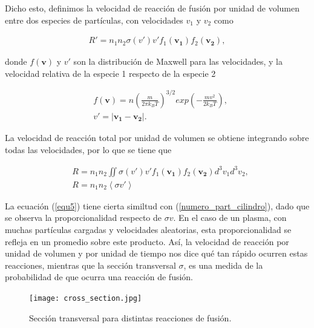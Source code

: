 \documentclass[../main.tex]{subfiles}
\begin{document}
	Dicho esto, definimos la velocidad de reacción de fusión por unidad de volumen entre dos especies de partículas, con velocidades $v_1$ y $v_2$ como
	
	\begin{align}
	    R' = n_1n_2\sigma(v')v'f_1(\mathbf{v_1})f_2(\mathbf{v_2}),  
	\end{align}
	
	donde $f(\mathbf{v})$ y $v'$ son la distribución de Maxwell para las velocidades, y la velocidad relativa de la especie 1 respecto de la especie 2
	
	\begin{align}
	    &f\left(\mathbf{v}\right) = n\left(\frac{m}{2\pi k_BT}\right)^{3/2}exp\left(-\frac{mv^2}{2k_BT}\right), \\
	    &v'= \left|\mathbf{v_1} - \mathbf{v_2} \right|.
	\end{align}
	
	La velocidad de reacción total por unidad de volumen se obtiene integrando sobre todas las velocidades, por lo que se tiene que
	
	\begin{align}
	    &R = n_1n_2\iint\sigma(v')v'f_1(\mathbf{v_1})f_2(\mathbf{v_2})d^3v_1d^3v_2, \label{equ4} \\
	    &R = n_1n_2\left<\sigma v' \right> \label{equ5}
	\end{align}
	
	La ecuación (\ref{equ5}) tiene cierta similtud con (\ref{numero_part_cilindro}), dado que se observa la proporcionalidad respecto de $\sigma v$. En el caso de un plasma, con muchas partículas cargadas y velocidades aleatorias, esta proporcionalidad se refleja en un promedio sobre este producto. Así, la velocidad de reacción por unidad de volumen y por unidad de tiempo nos dice qué tan rápido ocurren estas reacciones, mientras que la sección transversal $\sigma$, es una medida de la probabilidad de que ocurra una reacción de fusión. 
	
	\begin{figure}[h]
        \texttt{[image: cross\_section.jpg]}
        \caption{Sección transversal para distintas reacciones de fusión.}
        \label{fig:mesh1}
    \end{figure}
	  
	
	
\end{document}
